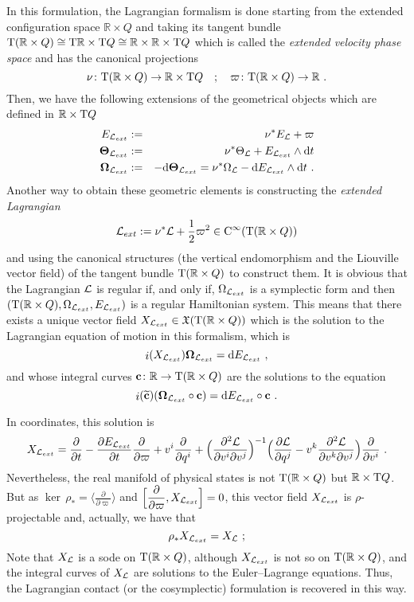 \documentclass[12pt]{report}
\def\beq{\begin{equation}}
\def\eeq{\end{equation}}
\def\beann{\begin{eqnarray*}}
\def\eeann{\end{eqnarray*}}
\def\derpar#1#2{\frac{\partial{#1}}{\partial{#2}}}
\def\vf{\mathfrak X}
\def\Lag{{\cal L}}
\def\d{{\rm d}}
\def\Real{\mathbb{R}}
\def\Tan{{\rm T}}
\def\inn{\mathop{i}\nolimits}
\def\Cinfty{{\rm C}^\infty}
\begin{document}
In this formulation,  the Lagrangian formalism is done
starting from the extended configuration space $\Real\times Q$
and taking its tangent bundle
$\Tan(\Real \times Q) \cong
 \Tan\Real\times\Tan Q \cong
 \Real \times \Real\times\Tan Q$
which is called the {\sl extended velocity phase space} and has the canonical projections
$$
\nu \colon\Tan(\Real\times Q)  \to \Real\times\Tan Q \quad ; \quad
\varpi \colon\Tan (\Real\times Q) \to \Real \ .
$$
Then, we have the following extensions of the
geometrical objects which are defined in  $\Real\times\Tan Q$
\beann
E_{{\cal L}_{ext}}&:=&\nu^*E_\Lag + \varpi 
\\
{\mathbf \Theta}_{{\cal L}_{ext}}&:=&
\nu^*\Theta_{\cal L} +E_{{\cal L}_{ext}} \wedge\d t
\\
{\mathbf \Omega}_{{\cal L}_{ext}}&:=&
-\d{\mathbf \Theta}_{{\cal L}_{ext}} =\nu^*\Omega_\Lag -\d E_{{\cal L}_{ext}} \wedge\d t \ .
\eeann
Another way to obtain these geometric elements is constructing
the {\sl extended Lagrangian}
\beq
{\cal L}_{ext} := \nu^*{\cal L} +\frac{1}{2}\varpi^2\in\Cinfty(\Tan(\Real\times Q))
\label{lext}
\eeq
and using the canonical structures (the vertical endomorphism and the Liouville vector field)
of the tangent bundle $\Tan(\Real\times Q)$ to construct them.
It is obvious that the Lagrangian ${\cal L}$ is regular if, and only if,
$\Omega_{\Lag_{ext}}$ is a symplectic form and then
$(\Tan(\Real\times Q),\Omega_{{\cal L}_{ext}},E_{{\cal L}_{ext}})$
is a regular Hamiltonian system. This means that there exists a unique vector field
$X_{{\cal L}_{ext}} \in\vf(\Tan(\Real\times Q))$ 
which is the solution to the  Lagrangian equation of motion in this formalism, which is
$$
\inn(X_{{\cal L}_{ext}}){\mathbf \Omega}_{{\cal L}_{ext}} = \d E_{{\cal L}_{ext}} \ ,
$$
and whose integral curves ${\bf c}\colon\Real\to\Tan(\Real\times Q)$ are the solutions to the equation
$$
\inn(\widetilde{\bf c})({\mathbf \Omega}_{{\cal L}_{ext}}\circ{\bf c}) = \d E_{{\cal L}_{ext}}\circ{\bf c}\ .
$$

In coordinates, this solution is
$$
X_{{\cal L}_{ext}} = \derpar{}{t} - \derpar{E_{{\cal L}_{ext}}}{t}\derpar{}{\varpi}  +
v^i\derpar{}{q^i} +
\Bigl(\displaystyle\frac{\partial^2{\cal L}}{\partial{v^i}\partial{v^j}}\Bigr)^{-1}
\Big(\derpar{{\cal L}}{q^j} -
v^k\frac{\partial^2{\cal L}}{\partial v^k \partial v^j}\Big)\derpar{}{v^i} \ .
$$
Nevertheless, the real manifold of physical states is not
$\Tan(\Real\times Q)$ but $\Real \times \Tan Q$.
But as $\ker\,\rho_*=\Big\langle\displaystyle\derpar{}{\varpi} \Big\rangle$ and
$\displaystyle\Big[\derpar{}{\varpi},X_{{\cal L}_{ext}} \Big]=0$,
this vector field $X_{{\cal L}_{ext}}$ is $\rho$-projectable and, actually, we have that
$$
\rho_*X_{{\cal L}_{ext}} =X_{\cal L} \ ;
$$
Note that $X_{\cal L}$ is a {\sc sode} on $\Tan(\Real\times Q)$,
although $X_{{\cal L}_{ext}}$ is not so on $\Tan(\Real\times Q)$,
and the integral curves of $X_\Lag$ are solutions to the Euler--Lagrange equations.
Thus, the Lagrangian contact (or the cosymplectic) formulation is recovered in this way.
\end{document}
